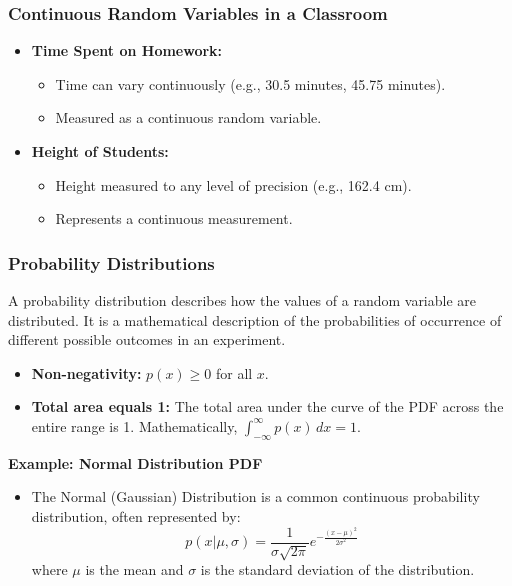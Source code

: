 \documentclass[aspectratio=169]{beamer}
\begin{document}
\begin{frame}
\frametitle{\textbf{Continuous Random Variables in a Classroom}}
\begin{itemize}
    \item [$\bullet$] \textbf{Time Spent on Homework:}
    \begin{itemize}
        \item [$-$] Time can vary continuously (e.g., 30.5 minutes, 45.75 minutes).
        \item [$-$]  Measured as a continuous random variable.
    \end{itemize}
    \item [$\bullet$] \textbf{Height of Students:}
    \begin{itemize}
        \item [$-$]  Height measured to any level of precision (e.g., 162.4 cm).
        \item [$-$]  Represents a continuous measurement.
    \end{itemize}
\end{itemize}
\end{frame}


\begin{frame}
\frametitle{\textbf{Probability Distributions}}
A probability distribution describes how the values of a random variable are distributed. It is a mathematical description of the probabilities of occurrence of different possible outcomes in an experiment.
 \begin{itemize}
        \item [$\bullet$]\textbf{Non-negativity:} \( p(x) \geq 0 \) for all \( x \).
        \item [$\bullet$] \textbf{Total area equals 1:} The total area under the curve of the PDF across the entire range is 1. Mathematically, \( \int_{-\infty}^{\infty} p(x) \, dx = 1 \).
    \end{itemize}

    \textbf{Example: Normal Distribution PDF}
    \begin{itemize}
        \item [$-$] The Normal (Gaussian) Distribution is a common continuous probability distribution, often represented by:
        \[
        p(x|\mu,\sigma) = \frac{1}{\sigma\sqrt{2\pi}} e^{-\frac{(x-\mu)^2}{2\sigma^2}}
        \]
        where \( \mu \) is the mean  and \( \sigma \) is the standard deviation of the distribution.
    \end{itemize}

\end{frame}
\end{document}
